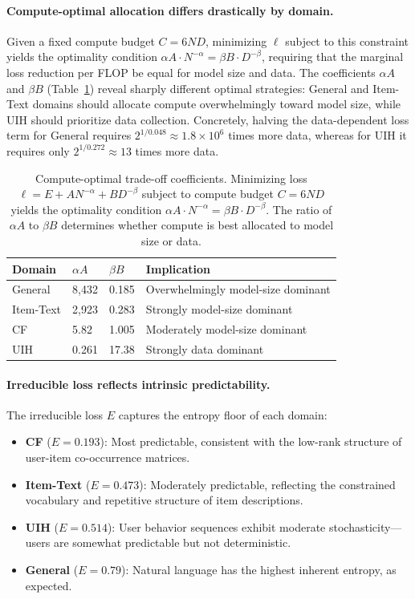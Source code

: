 \documentclass[]{fairmeta}
\begin{document}
  \paragraph{Compute-optimal allocation differs drastically by domain.}
  Given a fixed compute budget $C = 6ND$, minimizing $\ell$ subject to this constraint yields the optimality condition $\alpha A \cdot N^{-\alpha} = \beta B \cdot D^{-\beta}$, requiring that the marginal loss reduction per FLOP be equal for model size and data. The coefficients $\alpha A$ and
   $\beta B$ (Table~\ref{tab:scaling_trade}) reveal sharply different optimal strategies: General and Item-Text domains should allocate compute overwhelmingly toward model size, while UIH should prioritize data collection. Concretely, halving the data-dependent loss term for General requires
  $2^{1/0.048} \approx 1.8 \times 10^6$ times more data, whereas for UIH it requires only $2^{1/0.272} \approx 13$ times more data.

  \begin{table}[t]
  \caption{Compute-optimal trade-off coefficients. Minimizing loss $\ell = E + AN^{-\alpha} + BD^{-\beta}$ subject to compute budget $C = 6ND$ yields the optimality condition $\alpha A \cdot N^{-\alpha} = \beta B \cdot D^{-\beta}$. The ratio of $\alpha A$ to $\beta B$ determines whether
  compute is best allocated to model size or data.}\label{tab:scaling_trade}
  \centering
  \begin{tabular}{l|l|l|l}
  \toprule
  Domain    & $\alpha A$ & $\beta B$ & Implication \\
  \midrule
  General   & 8{,}432  & 0.185  & Overwhelmingly model-size dominant \\
  Item-Text & 2{,}923  & 0.283  & Strongly model-size dominant \\
  CF        & 5.82     & 1.005  & Moderately model-size dominant \\
  UIH       & 0.261    & 17.38  & Strongly data dominant \\
  \bottomrule
  \end{tabular}
  \end{table}

  \paragraph{Irreducible loss reflects intrinsic predictability.}
  The irreducible loss $E$ captures the entropy floor of each domain:
  \begin{itemize}
      \item \textbf{CF} ($E = 0.193$): Most predictable, consistent with the low-rank structure of user-item co-occurrence matrices.
      \item \textbf{Item-Text} ($E = 0.473$): Moderately predictable, reflecting the constrained vocabulary and repetitive structure of item descriptions.
      \item \textbf{UIH} ($E = 0.514$): User behavior sequences exhibit moderate stochasticity—users are somewhat predictable but not deterministic.
      \item \textbf{General} ($E = 0.79$): Natural language has the highest inherent entropy, as expected.
  \end{itemize}
\end{document}
